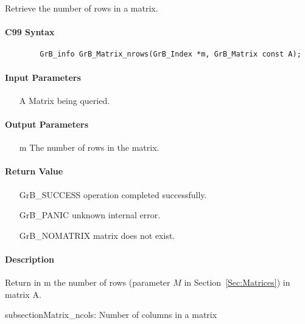 Retrieve the number of rows in a matrix.

\paragraph{C99 Syntax}

\begin{verbatim}
        GrB_info GrB_Matrix_nrows(GrB_Index *m, GrB_Matrix const A);
\end{verbatim}

\paragraph{Input Parameters}

\begin{itemize}[leftmargin=1.1in]
    \item[{\sf A}] Matrix being queried.
\end{itemize}

\paragraph{Output Parameters}
\begin{itemize}[leftmargin=1.1in]
    \item[{\sf m}] The number of rows in the matrix.
\end{itemize}

\paragraph{Return Value}

\begin{itemize}[leftmargin=2.1in]
\item[{\sf GrB\_SUCCESS}]   operation completed successfully.
\item[{\sf GrB\_PANIC}]     unknown internal error.
\item[{\sf GrB\_NOMATRIX}]  matrix does not exist.
\end{itemize}

\paragraph{Description}

Return in {\sf m} the number of rows (parameter $M$ in Section~\ref{Sec:Matrices}) in matrix {\sf A}.

subsection{{\sf Matrix\_ncols}: Number of columns in a matrix}

